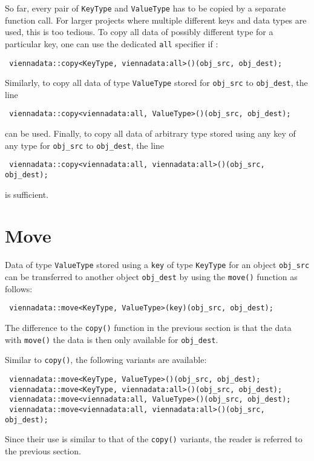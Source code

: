 So far, every pair of \lstinline|KeyType| and \lstinline|ValueType| has to be copied by a separate function call.
For larger projects where multiple different keys and data types are used, this is too tedious. To copy all
data of possibly different type for a particular key, one can use the dedicated \lstinline|all| specifier if :
\begin{lstlisting}
 viennadata::copy<KeyType, viennadata:all>()(obj_src, obj_dest);
\end{lstlisting}
Similarly, to copy all data of type \lstinline|ValueType| stored for \lstinline|obj_src| to \lstinline|obj_dest|, the line
\begin{lstlisting}
 viennadata::copy<viennadata:all, ValueType>()(obj_src, obj_dest);
\end{lstlisting}
can be used. Finally, to copy all data of arbitrary type stored using any key of any type for \lstinline|obj_src| to \lstinline|obj_dest|,
the line
\begin{lstlisting}
 viennadata::copy<viennadata:all, viennadata:all>()(obj_src, obj_dest);
\end{lstlisting}
is sufficient.


\section{Move}
Data of type \lstinline|ValueType| stored using a \lstinline|key| of type \lstinline|KeyType| for an object \lstinline|obj_src| can be transferred to another object \lstinline|obj_dest| by using
the \lstinline|move()| function as follows:
\begin{lstlisting}
 viennadata::move<KeyType, ValueType>(key)(obj_src, obj_dest);
\end{lstlisting}
The difference to the \lstinline|copy()| function in the previous section is that the data with \lstinline|move()| the data is then only available for \lstinline|obj_dest|.

Similar to \lstinline|copy()|, the following variants are available:
\begin{lstlisting}
 viennadata::move<KeyType, ValueType>()(obj_src, obj_dest);
 viennadata::move<KeyType, viennadata:all>()(obj_src, obj_dest);
 viennadata::move<viennadata:all, ValueType>()(obj_src, obj_dest);
 viennadata::move<viennadata:all, viennadata:all>()(obj_src, obj_dest);
\end{lstlisting}
Since their use is similar to that of the \lstinline|copy()| variants, the reader is referred to the previous section.

